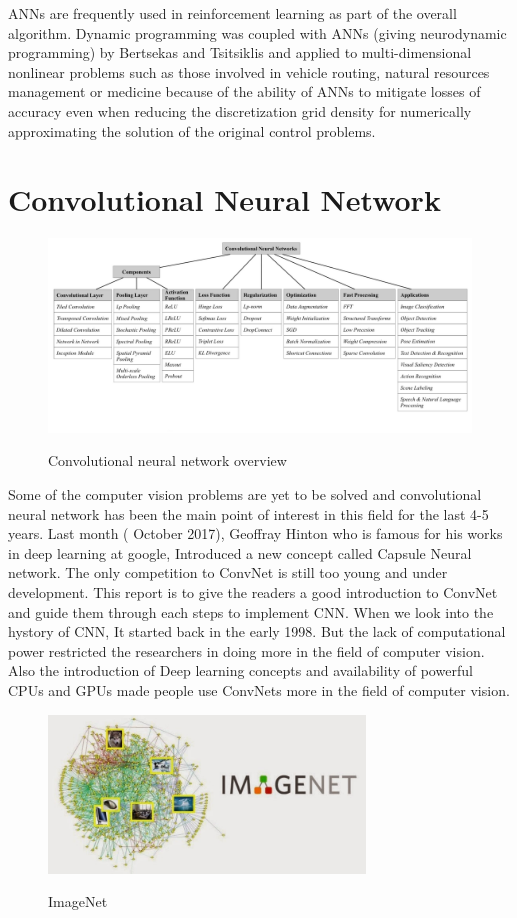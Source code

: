 \documentclass[12pt]{article}
\begin{document}
        ANNs are frequently used in reinforcement learning as part of the overall algorithm. Dynamic programming was coupled with ANNs (giving neurodynamic programming) by Bertsekas and Tsitsiklis and applied to multi-dimensional nonlinear problems such as those involved in vehicle routing, natural resources management or medicine because of the ability of ANNs to mitigate losses of accuracy even when reducing the discretization grid density for numerically approximating the solution of the original control problems.
\section{\fontsize{14}{14}\selectfont Convolutional Neural Network}
\begin{figure}[h]
    	\centering
    	\includegraphics[width=1\textwidth]{cnn1.jpg}
       	\label{fig:mesh5}
	\caption{Convolutional neural network overview}
	\end{figure} 

    Some of the computer vision problems are yet to be solved and convolutional neural network has been the main point of interest in this field for the last 4-5 years. Last month ( October 2017), Geoffray Hinton who is famous for his works in deep learning at google, Introduced a new concept called Capsule Neural network. The only competition to ConvNet is still too young and under development. This report is to give the readers a good introduction to ConvNet and guide them through each steps to implement CNN. When we look into the hystory of CNN, It started back in the early 1998. But the lack of computational power restricted the researchers in doing more in the field of computer vision. Also the introduction of Deep learning concepts and availability of powerful CPUs and GPUs made people use ConvNets more in the field of computer vision. 

\begin{figure}[h]
    	\centering
    	\includegraphics[width=0.75\textwidth]{e.jpg}
       	\label{fig:mesh6}
	\caption{ImageNet}
	\end{figure} 
    
\end{document}

